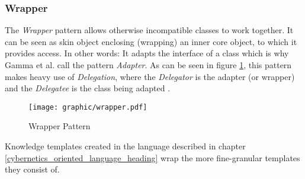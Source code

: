 %
%
%
%
%
%
%

\subsubsection{Wrapper}
\label{wrapper_heading}

The \emph{Wrapper} pattern \cite{gamma1995} allows otherwise incompatible
classes to work together. It can be seen as skin object enclosing (wrapping) an
inner core object, to which it provides access. In other words: It adapts the
interface of a class which is why Gamma et al. call the pattern \emph{Adapter}.
As can be seen in figure \ref{wrapper_figure}, this pattern makes heavy use of
\emph{Delegation}, where the \emph{Delegator} is the adapter (or wrapper) and
the \emph{Delegatee} is the class being adapted \cite{portland}.

\begin{figure}[ht]
    \begin{center}
        \texttt{[image: graphic/wrapper.pdf]}
        \caption{Wrapper Pattern}
        \label{wrapper_figure}
    \end{center}
\end{figure}

Knowledge templates created in the language described in chapter
\ref{cybernetics_oriented_language_heading} wrap the more fine-granular
templates they consist of.
